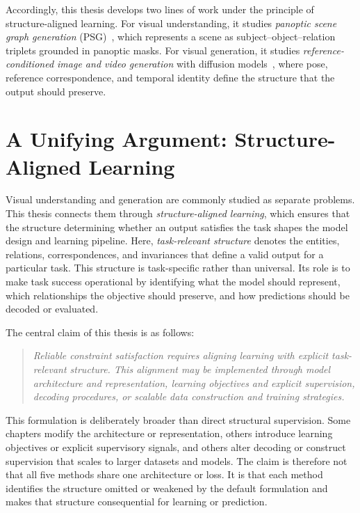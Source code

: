 Accordingly, this thesis develops two lines of work under the principle of structure-aligned learning. For visual understanding, it studies \emph{panoptic scene graph generation} (PSG)~\citep{yang2022panoptic}, which represents a scene as subject--object--relation triplets grounded in panoptic masks. For visual generation, it studies \emph{reference-conditioned image and video generation} with diffusion models~\citep{ho2020denoising, rombach2022high}, where pose, reference correspondence, and temporal identity define the structure that the output should preserve.

\section{A Unifying Argument: Structure-Aligned Learning}
\label{sec:unifying_argument}
Visual understanding and generation are commonly studied as separate problems. This thesis connects them through \emph{structure-aligned learning}, which ensures that the structure determining whether an output satisfies the task shapes the model design and learning pipeline. Here, \emph{task-relevant structure} denotes the entities, relations, correspondences, and invariances that define a valid output for a particular task. This structure is task-specific rather than universal. Its role is to make task success operational by identifying what the model should represent, which relationships the objective should preserve, and how predictions should be decoded or evaluated.

The central claim of this thesis is as follows:

\begin{quote}
\emph{Reliable constraint satisfaction requires aligning learning with explicit task-relevant structure. This alignment may be implemented through model architecture and representation, learning objectives and explicit supervision, decoding procedures, or scalable data construction and training strategies.}
\end{quote}

This formulation is deliberately broader than direct structural supervision. Some chapters modify the architecture or representation, others introduce learning objectives or explicit supervisory signals, and others alter decoding or construct supervision that scales to larger datasets and models. The claim is therefore not that all five methods share one architecture or loss. It is that each method identifies the structure omitted or weakened by the default formulation and makes that structure consequential for learning or prediction.

